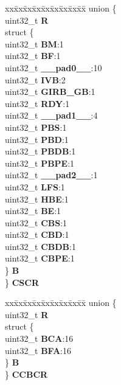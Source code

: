 \begin{DoxyCompactItemize}
\begin{tabbing}
\end{tabbing}\item 
\mbox{\label{structMLB__tag_1_1mlbch__t_a25047947ce20f1e98a8cc8f1e10034cc}} 
\begin{tabbing}
xx\=xx\=xx\=xx\=xx\=xx\=xx\=xx\=xx\=\kill
union \{\\
\>uint32\_t {\bfseries R}\\
\>struct \{\\
\>\>uint32\_t {\bfseries BM}:1\\
\>\>uint32\_t {\bfseries BF}:1\\
\>\>uint32\_t {\bfseries \_\_pad0\_\_}:10\\
\>\>uint32\_t {\bfseries IVB}:2\\
\>\>uint32\_t {\bfseries GIRB\_GB}:1\\
\>\>uint32\_t {\bfseries RDY}:1\\
\>\>uint32\_t {\bfseries \_\_pad1\_\_}:4\\
\>\>uint32\_t {\bfseries PBS}:1\\
\>\>uint32\_t {\bfseries PBD}:1\\
\>\>uint32\_t {\bfseries PBDB}:1\\
\>\>uint32\_t {\bfseries PBPE}:1\\
\>\>uint32\_t {\bfseries \_\_pad2\_\_}:1\\
\>\>uint32\_t {\bfseries LFS}:1\\
\>\>uint32\_t {\bfseries HBE}:1\\
\>\>uint32\_t {\bfseries BE}:1\\
\>\>uint32\_t {\bfseries CBS}:1\\
\>\>uint32\_t {\bfseries CBD}:1\\
\>\>uint32\_t {\bfseries CBDB}:1\\
\>\>uint32\_t {\bfseries CBPE}:1\\
\>\} {\bfseries B}\\
\} {\bfseries CSCR}\\

\end{tabbing}\item 
\mbox{\label{structMLB__tag_1_1mlbch__t_a0a986cfac40c0d93fb3edcc4d20bd2cd}} 
\begin{tabbing}
xx\=xx\=xx\=xx\=xx\=xx\=xx\=xx\=xx\=\kill
union \{\\
\>uint32\_t {\bfseries R}\\
\>struct \{\\
\>\>uint32\_t {\bfseries BCA}:16\\
\>\>uint32\_t {\bfseries BFA}:16\\
\>\} {\bfseries B}\\
\} {\bfseries CCBCR}\\


\end{tabbing}
\end{DoxyCompactItemize}
